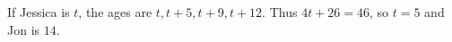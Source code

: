 If Jessica is $ t $, the ages are $ t,t+5,t+9,t+12 $. Thus $ 4t+26=46 $, so $ t=5 $ and Jon is $\boxed{14}$.
